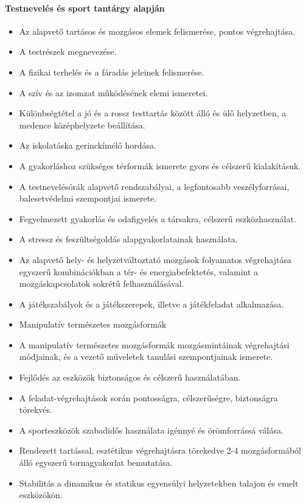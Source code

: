 \paragraph{Testnevelés és sport tantárgy alapján}
\begin{itemize}
\item Az alapvető tartásos és mozgásos elemek felismerése, pontos végrehajtása.
\item A testrészek megnevezése.
\item A fizikai terhelés és a fáradás jeleinek felismerése.
\item A szív és az izomzat működésének elemi ismeretei.
\item Különbségtétel a jó és a rossz testtartás között álló és ülő helyzetben, a medence középhelyzete beállítása.
\item Az iskolatáska gerinckímélő hordása.
\item A gyakorláshoz szükséges térformák ismerete gyors és célszerű kialakításuk.
\item A testnevelésórák alapvető rendszabályai, a legfontosabb veszélyforrásai, balesetvédelmi szempontjai ismerete.
\item Fegyelmezett gyakorlás és odafigyelés a társakra, célszerű eszközhasználat.
\item A stressz és feszültségoldás alapgyakorlatainak használata.
\item Az alapvető hely- és helyzetváltoztató mozgások folyamatos végrehajtása egyszerű kombinációkban a tér- és energiabefektetés, valamint a mozgáskapcsolatok sokrétű felhasználásával.
\item A játékszabályok és a játékszerepek, illetve a játékfeladat alkalmazása.
\item Manipulatív természetes mozgásformák
\item A manipulatív természetes mozgásformák mozgásmintáinak végrehajtási módjainak, és a vezető műveletek tanulási szempontjainak ismerete.
\item Fejlődés az eszközök biztonságos és célszerű használatában.
\item A feladat-végrehajtások során pontosságra, célszerűségre, biztonságra törekvés.
\item A sporteszközök szabadidős használata igénnyé és örömforrássá válása.
\item Rendezett tartással, esztétikus végrehajtásra törekedve 2-4 mozgásformából álló egyszerű tornagyakorlat bemutatása.
\item Stabilitás a dinamikus és statikus egyensúlyi helyzetekben talajon és emelt eszközökön.

\end{itemize}
